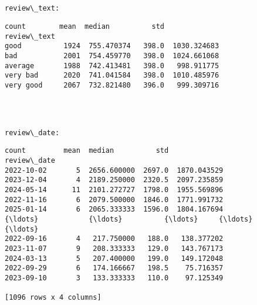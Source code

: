 \documentclass[11pt]{article}
\begin{document}
    
    \begin{center}
    \end{center}
    { \hspace*{\fill} \\}
    
    \begin{Verbatim}[commandchars=\\\{\}]

review\_text:
    \end{Verbatim}

    
    \begin{Verbatim}[commandchars=\\\{\}]
             count        mean  median          std
review\_text                                        
good          1924  755.470374   398.0  1030.324683
bad           2001  754.459770   398.0  1024.661068
average       1988  742.413481   398.0   998.911775
very bad      2020  741.041584   398.0  1010.485976
very good     2067  732.821480   396.0   999.309716
    \end{Verbatim}

    
    \begin{center}
    \end{center}
    { \hspace*{\fill} \\}
    
    \begin{Verbatim}[commandchars=\\\{\}]

review\_date:
    \end{Verbatim}

    
    \begin{Verbatim}[commandchars=\\\{\}]
             count         mean  median          std
review\_date                                         
2022-10-02       5  2656.600000  2697.0  1870.043529
2023-12-04       4  2189.250000  2320.5  2097.235859
2024-05-14      11  2101.272727  1798.0  1955.569896
2022-11-16       6  2079.500000  1846.0  1771.991732
2025-01-14       6  2065.333333  1596.0  1804.167694
{\ldots}            {\ldots}          {\ldots}     {\ldots}          {\ldots}
2022-09-16       4   217.750000   188.0   138.377202
2023-11-07       9   208.333333   129.0   143.767173
2024-03-13       5   207.400000   199.0   149.172048
2022-09-29       6   174.166667   198.5    75.716357
2023-09-10       3   133.333333   110.0    97.125349

[1096 rows x 4 columns]
    \end{Verbatim}
\end{document}
